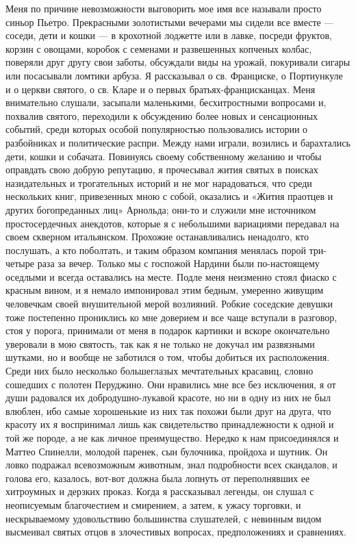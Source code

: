 Меня по причине  невозможности выговорить мое имя  все называли просто
синьор Пьетро.  Прекрасными золотистыми вечерами мы  сидели все вместе
--- соседи, дети и кошки --- в крохотной лоджетте или в лавке, посреди
фруктов, корзин с  овощами, коробок с семенами  и развешенных копченых
колбас, поверяли  друг другу  свои заботы,  обсуждали виды  на урожай,
покуривали  сигары  или посасывали  ломтики  арбуза.  Я рассказывал  о
св.  Франциске, о  Портиункуле  и  о церкви  святого,  о  св. Кларе  и
о  первых братьях-францисканцах.  Меня  внимательно слушали,  засыпали
маленькими, бесхитростными  вопросами и, похвалив  святого, переходили
к  обсуждению  более  новых  и  сенсационных  событий,  среди  которых
особой популярностью пользовались истории о разбойниках и политические
распри.  Между  нами играли,  возились  и  барахтались дети,  кошки  и
собачата. Повинуясь своему собственному желанию и чтобы оправдать свою
добрую репутацию, я прочесывал жития  святых в поисках назидательных и
трогательных  историй  и не  мог  нарадоваться,  что среди  нескольких
книг,  привезенных  мною  с  собой,  оказались  и  «Жития  праотцев  и
других богопреданных  лиц» Арнольда;  они-то и служили  мне источником
простосердечных анекдотов, которые я с небольшими вариациями передавал
на  своем скверном  итальянском.  Прохожие останавливались  ненадолго,
кто  послушать, а  кто поболтать,  и таким  образом компания  менялась
порой  три-четыре раза  за вечер.  Только мы  с госпожой  Нардини были
по-настоящему  оседлыми  и  всегда  оставались на  месте.  Подле  меня
неизменно  стоял  фиаско  с  красным вином,  и  я  немало  импонировал
этим  бедным, умеренно  живущим  человечкам  своей внушительной  мерой
возлияний. Робкие соседские девушки  тоже постепенно прониклись ко мне
доверием и все  чаще вступали в разговор, стоя у  порога, принимали от
меня  в  подарок  картинки  и  вскоре  окончательно  уверовали  в  мою
святость, так как  я не только не докучал им  развязными шутками, но и
вообще не заботился  о том, чтобы добиться их  расположения. Среди них
было несколько  большеглазых мечтательных красавиц, словно  сошедших с
полотен Перуджино.  Они нравились  мне все без  исключения, я  от души
радовался их  добродушно-лукавой красоте, но ни  в одну из них  не был
влюблен, ибо самые  хорошенькие из них так похожи были  друг на друга,
что красоту их  я воспринимал лишь как  свидетельство принадлежности к
одной и  той же породе,  а не как  личное преимущество. Нередко  к нам
присоединялся  и  Маттео  Спинелли, молодой  паренек,  сын  булочника,
пройдоха  и  шутник. Он  ловко  подражал  всевозможным животным,  знал
подробности  всех скандалов,  и голова  его, казалось,  вот-вот должна
была лопнуть от переполнявших ее  хитроумных и дерзких проказ. Когда я
рассказывал легенды, он слушал с неописуемым благочестием и смирением,
а затем,  к ужасу  торговки, и нескрываемому  удовольствию большинства
слушателей,  с невинным  видом  высмеивал святых  отцов в  злочестивых
вопросах, предположениях и сравнениях.

